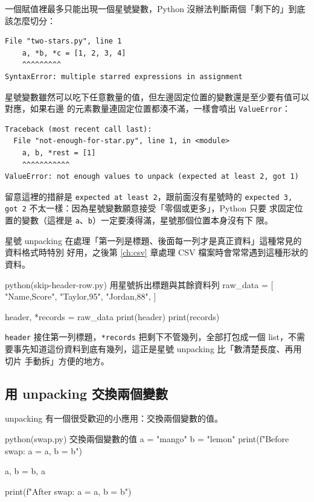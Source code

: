 一個賦值裡最多只能出現一個星號變數，Python 沒辦法判斷兩個「剩下的」到底
該怎麼切分：

\begin{verbatim}
File "two-stars.py", line 1
    a, *b, *c = [1, 2, 3, 4]
    ^^^^^^^^^
SyntaxError: multiple starred expressions in assignment
\end{verbatim}

星號變數雖然可以吃下任意數量的值，但左邊固定位置的變數還是至少要有值可以對應，如果右邊
的元素數量連固定位置都湊不滿，一樣會噴出 \texttt{ValueError}：

\begin{verbatim}
Traceback (most recent call last):
  File "not-enough-for-star.py", line 1, in <module>
    a, b, *rest = [1]
    ^^^^^^^^^^^
ValueError: not enough values to unpack (expected at least 2, got 1)
\end{verbatim}

留意這裡的措辭是 \texttt{expected at least 2}，跟前面沒有星號時的
\texttt{expected 3, got 2} 不太一樣：因為星號變數願意接受「零個或更多」，Python 只要
求固定位置的變數（這裡是 \texttt{a}、\texttt{b}）一定要湊得滿，星號那個位置本身沒有下
限。

星號 unpacking 在處理「第一列是標題、後面每一列才是真正資料」這種常見的資料格式時特別
好用，之後第 \ref{ch:csv} 章處理 CSV 檔案時會常常遇到這種形狀的資料。

\begin{example}{python}{(skip-header-row.py) 用星號拆出標題與其餘資料列}
raw_data = [
    "Name,Score",
    "Taylor,95",
    "Jordan,88",
]

header, *records = raw_data
print(header)
print(records)
\end{example}


\texttt{header} 接住第一列標題，\texttt{*records} 把剩下不管幾列，全部打包成一個
list，不需要事先知道這份資料到底有幾列，這正是星號 unpacking 比「數清楚長度、再用切片
手動拆」方便的地方。

\subsection*{用 unpacking 交換兩個變數}

unpacking 有一個很受歡迎的小應用：交換兩個變數的值。

\begin{example}{python}{(swap.py) 交換兩個變數的值}
a = "mango"
b = "lemon"
print(f"Before swap: a = {a}, b = {b}")

a, b = b, a

print(f"After swap: a = {a}, b = {b}")
\end{example}

